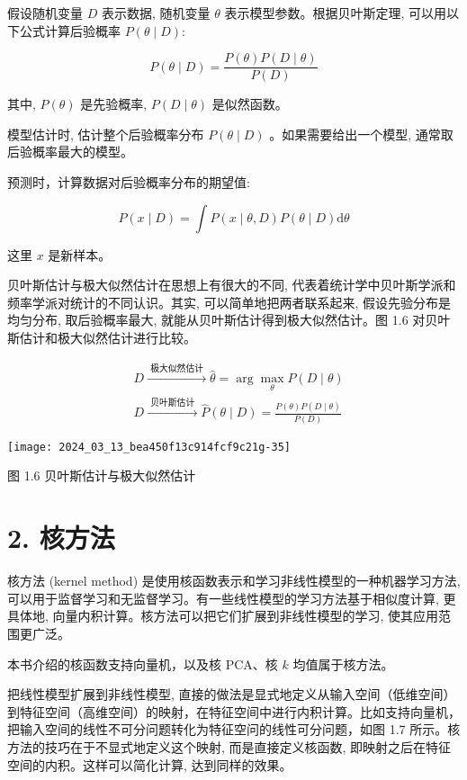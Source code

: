 \documentclass[10pt]{article}
\begin{document}
\begin{CJK*}{UTF8}{bsmi}
假设随机变量 $D$ 表示数据, 随机变量 $\theta$ 表示模型参数。根据贝叶斯定理, 可以用以下公式计算后验概率 $P(\theta \mid D):$


\begin{equation*}
P(\theta \mid D)=\frac{P(\theta) P(D \mid \theta)}{P(D)} \tag{1.3}
\end{equation*}


其中, $P(\theta)$ 是先验概率, $P(D \mid \theta)$ 是似然函数。

模型估计时, 估计整个后验概率分布 $P(\theta \mid D)$ 。如果需要给出一个模型, 通常取后验概率最大的模型。

预测时，计算数据对后验概率分布的期望值:


\begin{equation*}
P(x \mid D)=\int P(x \mid \theta, D) P(\theta \mid D) \mathrm{d} \theta \tag{1.4}
\end{equation*}


这里 $x$ 是新样本。

贝叶斯估计与极大似然估计在思想上有很大的不同, 代表着统计学中贝叶斯学派和频率学派对统计的不同认识。其实, 可以简单地把两者联系起来, 假设先验分布是均匀分布, 取后验概率最大, 就能从贝叶斯估计得到极大似然估计。图 1.6 对贝叶斯估计和极大似然估计进行比较。

$$
\begin{aligned}
& D \xrightarrow{\text { 极大似然估计 }} \hat{\theta}=\arg \max _{\theta} P(D \mid \theta) \\
& D \xrightarrow{\text { 贝叶斯估计 }} \hat{P}(\theta \mid D)=\frac{P(\theta) P(D \mid \theta)}{P(D)}
\end{aligned}
$$

\begin{center}
\texttt{[image: 2024\_03\_13\_bea450f13c914fcf9c21g-35]}
\end{center}

图 1.6 贝叶斯估计与极大似然估计

\section*{2. 核方法}
核方法 (kernel method) 是使用核函数表示和学习非线性模型的一种机器学习方法, 可以用于监督学习和无监督学习。有一些线性模型的学习方法基于相似度计算, 更具体地, 向量内积计算。核方法可以把它们扩展到非线性模型的学习, 使其应用范围更广泛。

本书介绍的核函数支持向量机，以及核 PCA、核 $k$ 均值属于核方法。

把线性模型扩展到非线性模型, 直接的做法是显式地定义从输入空间（低维空间）到特征空间（高维空间）的映射，在特征空间中进行内积计算。比如支持向量机，把输入空间的线性不可分问题转化为特征空问的线性可分问题，如图 1.7 所示。核方法的技巧在于不显式地定义这个映射, 而是直接定义核函数, 即映射之后在特征空间的内积。这样可以简化计算, 达到同样的效果。


\end{CJK*}
\end{document}
